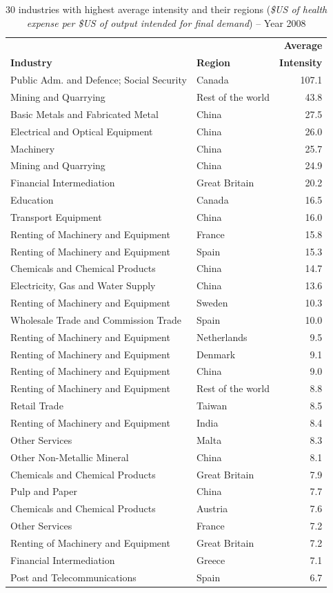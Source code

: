\documentclass[a4paper,12pt, ]{article}
\begin{document}
\begin{table} %
\caption{30 industries with highest average intensity and their regions (\textit{\$US of health expense per \$US of output intended for final demand}) -- Year 2008} 
\begin{center}
\small \begin{tabular}{llr}
  &  & \textbf{Average}\\ 
 \textbf{Industry} & \textbf{Region} & \textbf{Intensity}\\ 
 \hline
Public Adm. and Defence; Social Security & Canada & 107.1\\ 
Mining and Quarrying & Rest of the world & 43.8\\ 
Basic Metals and Fabricated Metal & China & 27.5\\ 
Electrical and Optical Equipment & China & 26.0\\ 
Machinery & China & 25.7\\ 
Mining and Quarrying & China & 24.9\\ 
Financial Intermediation & Great Britain & 20.2\\ 
Education & Canada & 16.5\\ 
Transport Equipment & China & 16.0\\ 
Renting of Machinery and Equipment & France & 15.8\\ 
Renting of Machinery and Equipment & Spain & 15.3\\ 
Chemicals and Chemical Products & China & 14.7\\ 
Electricity, Gas and Water Supply & China & 13.6\\ 
Renting of Machinery and Equipment & Sweden & 10.3\\ 
Wholesale Trade and Commission Trade & Spain & 10.0\\ 
Renting of Machinery and Equipment & Netherlands & 9.5\\ 
Renting of Machinery and Equipment & Denmark & 9.1\\ 
Renting of Machinery and Equipment & China & 9.0\\ 
Renting of Machinery and Equipment & Rest of the world & 8.8\\ 
Retail Trade & Taiwan & 8.5\\ 
Renting of Machinery and Equipment & India & 8.4\\ 
Other Services & Malta & 8.3\\ 
Other Non-Metallic Mineral & China & 8.1\\ 
Chemicals and Chemical Products & Great Britain & 7.9\\ 
Pulp and Paper & China & 7.7\\ 
Chemicals and Chemical Products & Austria & 7.6\\ 
Other Services & France & 7.2\\ 
Renting of Machinery and Equipment & Great Britain & 7.2\\ 
Financial Intermediation & Greece & 7.1\\ 
Post and Telecommunications & Spain & 6.7\\ 
\hline
\end{tabular}
\label{tab01} 
\end{center}
\end{table}
\end{document}
